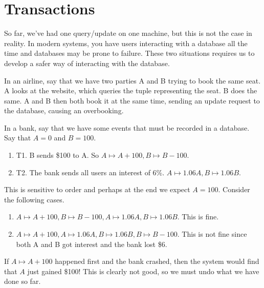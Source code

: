 \section{Transactions} 

  So far, we've had one query/update on one machine, but this is not the case in reality. In modern systems, you have users interacting with a database all the time and databases may be prone to failure. These two situations requires us to develop a safer way of interacting with the database. 

  \begin{example}
    \label{ex:simultaneous-interaction}
    In an airline, say that we have two parties A and B trying to book the same seat. A looks at the website, which queries the tuple representing the seat. B does the same. A and B then both book it at the same time, sending an update request to the database, causing an overbooking. 

    In a bank, say that we have some events that must be recorded in a database. Say that $A = 0$ and $B = 100$. 
    \begin{enumerate}
      \item T1. B sends \$100 to A. So $A \mapsto A + 100, B \mapsto B - 100$. 
      \item T2. The bank sends all users an interest of 6\%. $A \mapsto 1.06 A, B \mapsto 1.06B$. 
    \end{enumerate}
    This is sensitive to order and perhaps at the end we expect $A = 100$. Consider the following cases. 
    \begin{enumerate} 
      \item $A \mapsto A + 100, B \mapsto B - 100, A \mapsto 1.06A, B \mapsto 1.06B$. This is fine. 
      \item $A \mapsto A + 100, A \mapsto 1.06A, B \mapsto 1.06B, B \mapsto B - 100$. This is not fine since both A and B got interest and the bank lost \$6. 
    \end{enumerate}
  \end{example}

  \begin{example}
    \label{ex:database-crash}
    If $A \mapsto A + 100$ happened first and the bank crashed, then the system would find that $A$ just gained \$100! This is clearly not good, so we must undo what we have done so far. 
  \end{example}

